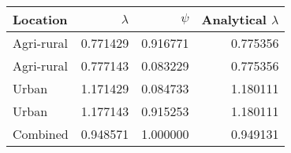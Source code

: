 \begin{tabular}{lrrr}
\toprule
   Location &  $\lambda$ &    $\psi$ &  Analytical $\lambda$ \\
\midrule
 Agri-rural &   0.771429 &  0.916771 &              0.775356 \\
 Agri-rural &   0.777143 &  0.083229 &              0.775356 \\
      Urban &   1.171429 &  0.084733 &              1.180111 \\
      Urban &   1.177143 &  0.915253 &              1.180111 \\
   Combined &   0.948571 &  1.000000 &              0.949131 \\
\bottomrule
\end{tabular}
